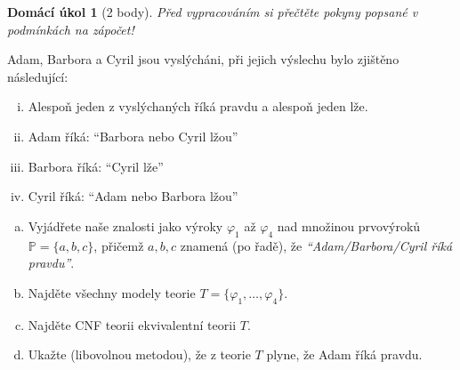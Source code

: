 \documentclass[a4paper]{article}
\theoremstyle{definition}
\newtheorem*{ukol}{Domácí úkol}
\begin{document}
\medskip\begin{ukol}[2 body]
{\it Před vypracováním si přečtěte pokyny popsané v podmínkách na zápočet!}
    
\medskip    
    
Adam, Barbora a Cyril jsou vyslýcháni, při jejich výslechu bylo zjištěno následující:
\begin{enumerate}[(i)]
    \item Alespoň jeden z vyslýchaných říká pravdu a alespoň jeden lže.
    \item Adam říká: ``Barbora nebo Cyril lžou''
    \item Barbora říká: ``Cyril lže''
    \item Cyril říká: ``Adam nebo Barbora lžou''
\end{enumerate}
\begin{enumerate}[(a)]
    \item Vyjádřete naše znalosti jako výroky $\varphi_1$ až $\varphi_4$ nad množinou prvovýroků $\mathbb{P}=\{a,b,c\}$, přičemž $a,b,c$ znamená (po řadě), že {\it ``Adam/Barbora/Cyril říká pravdu''}.
    \item Najděte všechny modely teorie $T = \{\varphi_1, \dots, \varphi_4\}$.
    \item Najděte CNF teorii ekvivalentní teorii $T$.
    \item Ukažte (libovolnou metodou), že z teorie $T$ plyne, že Adam říká pravdu.
\end{enumerate}    
\end{ukol}
\end{document}
